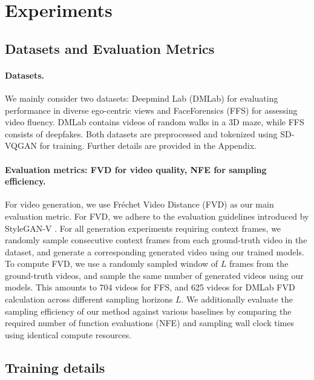 \vspace{-1pt}
\section{Experiments}

\subsection{Datasets and Evaluation Metrics}

\paragraph{Datasets.} We mainly consider two datasets: Deepmind Lab (DMLab) for evaluating performance in diverse ego-centric views and FaceForensics (FFS) for assessing video fluency. DMLab contains videos of random walks in a 3D maze, while FFS consists of deepfakes. Both datasets are preprocessed and tokenized using SD-VQGAN \cite{rombach2022high_latentdiffusion_ldm} for training. Further details are provided in the Appendix.

\paragraph{Evaluation metrics: FVD for video quality, NFE for sampling efficiency.}  For video generation, we use Fréchet Video Distance (FVD) \cite{unterthiner2018towards} as our main evaluation metric. For FVD, we adhere to the evaluation guidelines introduced by StyleGAN-V \cite{ma2024latte,skorokhodov2022stylegan_v}.
%
For all generation experiments requiring context frames, we randomly sample consecutive context frames from each ground-truth video in the dataset, and generate a corresponding generated video using our trained models. 
%
To compute FVD, we use a randomly sampled window of $L$ frames from the ground-truth videos, and sample the same number of generated videos using our models. This amounts to 704 videos for FFS, and 625 videos for DMLab FVD calculation across different sampling horizons $L$. 
%
We additionally evaluate the sampling efficiency of our method against various baselines by comparing the required number of function evaluations (NFE) and sampling wall clock times using identical compute resources.

\subsection{Training details}

